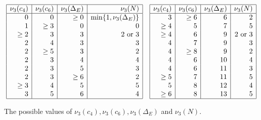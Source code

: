 \begin{table}[h]
$$
\begin{array}{|r|r|r|r|}
\hline
\nu_3 (c_4) & \nu_3 (c_6) & \nu_3 (\Delta_E) & \nu_3 (N)  \\ \hline
0 & 0 & \geq 0  & \min \{ 1, \nu_3 (\Delta_E)  \}  \\
1 & \geq 3 & 0 & 0  \\
\geq 2 & 3 & 3 & 2 \mbox{ or } 3  \\
2 & 4 & 3 & 3  \\
2 & \geq 5 & 3 & 2  \\
2 & 3 & 4 & 4  \\
2 & 3 & 5 & 3  \\
2 & 3 & \geq 6 & 2  \\
\geq 3 & 4 & 5 & 5  \\
3 & 5 & 6 & 4  \\
\hline
\end{array}
\quad
\begin{array}{|r|r|r|r|}
\hline
\nu_3 (c_4) & \nu_3 (c_6) & \nu_3 (\Delta_E) & \nu_3 (N)  \\ \hline
 3 & \geq 6 & 6 & 2 \\
 \geq 4 & 5 & 7 & 5 \\
 \geq 4 & 6 & 9 & 2 \mbox{ or } 3 \\
 4 & 7 & 9 & 3 \\
 4 & \geq 8 & 9 & 2 \\
 4 & 6 & 10 & 4 \\
 4 & 6 & 11 & 3 \\
 \geq 5 & 7 & 11 & 5 \\
 5 & 8 & 12 & 4 \\
 \geq 6 & 8 & 13 & 5 \\
\hline
\end{array}
$$

\caption{The possible values of $\nu_3(c_4), \nu_3(c_6), \nu_3(\Delta_E)$ and $\nu_3(N)$.}
\label{tab nu3}
\end{table}

